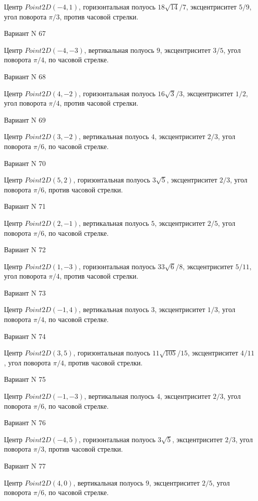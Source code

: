 \documentclass[11pt]{report}
\begin{document}
Центр $Point2D\left(-4, 1\right)$, горизонтальная полуось $18 \sqrt{14} / 7$, эксцентриситет $5 / 9$, угол поворота $\pi / 3$, против часовой стрелки.

Вариант N 67

Центр $Point2D\left(-4, -3\right)$, вертикальная полуось $9$, эксцентриситет $3 / 5$, угол поворота $\pi / 4$, по часовой стрелке.

Вариант N 68

Центр $Point2D\left(4, -2\right)$, горизонтальная полуось $16 \sqrt{3} / 3$, эксцентриситет $1 / 2$, угол поворота $\pi / 4$, против часовой стрелки.

Вариант N 69

Центр $Point2D\left(3, -2\right)$, вертикальная полуось $4$, эксцентриситет $2 / 3$, угол поворота $\pi / 6$, по часовой стрелке.

Вариант N 70

Центр $Point2D\left(5, 2\right)$, горизонтальная полуось $3 \sqrt{5}$, эксцентриситет $2 / 3$, угол поворота $\pi / 6$, против часовой стрелки.

Вариант N 71

Центр $Point2D\left(2, -1\right)$, вертикальная полуось $5$, эксцентриситет $2 / 5$, угол поворота $\pi / 6$, по часовой стрелке.

Вариант N 72

Центр $Point2D\left(1, -3\right)$, горизонтальная полуось $33 \sqrt{6} / 8$, эксцентриситет $5 / 11$, угол поворота $\pi / 4$, против часовой стрелки.

Вариант N 73

Центр $Point2D\left(-1, 4\right)$, вертикальная полуось $3$, эксцентриситет $1 / 3$, угол поворота $\pi / 4$, по часовой стрелке.

Вариант N 74

Центр $Point2D\left(3, 5\right)$, горизонтальная полуось $11 \sqrt{105} / 15$, эксцентриситет $4 / 11$, угол поворота $\pi / 4$, против часовой стрелки.

Вариант N 75

Центр $Point2D\left(-1, -3\right)$, вертикальная полуось $4$, эксцентриситет $2 / 3$, угол поворота $\pi / 6$, по часовой стрелке.

Вариант N 76

Центр $Point2D\left(-4, 5\right)$, горизонтальная полуось $3 \sqrt{5}$, эксцентриситет $2 / 3$, угол поворота $\pi / 3$, против часовой стрелки.

Вариант N 77

Центр $Point2D\left(4, 0\right)$, вертикальная полуось $9$, эксцентриситет $2 / 5$, угол поворота $\pi / 6$, по часовой стрелке.
\end{document}
